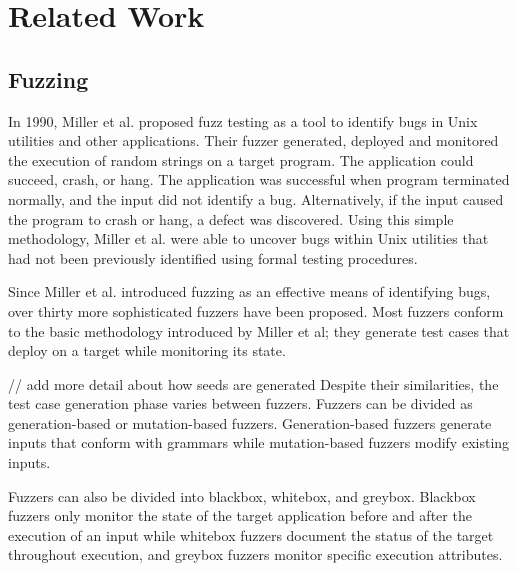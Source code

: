 \section{Related Work}

\subsection{Fuzzing}
In 1990, Miller et al. proposed fuzz testing as a tool to identify bugs in Unix utilities and other 
applications. Their fuzzer generated, deployed and monitored the execution of random strings on a 
target program. The application could succeed, crash, or hang. The application was successful when 
program terminated normally, and the input did not identify a bug. Alternatively, if the input caused 
the program to crash or hang, a defect was discovered. Using this simple methodology, Miller et al. 
were able to uncover bugs within Unix utilities that had not been previously identified using formal 
testing procedures. \cite{Miller}

Since Miller et al. introduced fuzzing as an effective means of identifying bugs, over thirty more 
sophisticated fuzzers have been proposed. Most fuzzers conform to the basic methodology introduced by 
Miller et al; they generate test cases that deploy on a target while monitoring its state. 

// add more detail about how seeds are generated
Despite their similarities, the test case generation phase varies between fuzzers. Fuzzers can be 
divided as generation-based or mutation-based fuzzers. Generation-based fuzzers generate inputs that 
conform with grammars while mutation-based fuzzers modify existing inputs. 

Fuzzers can also be divided into blackbox, whitebox, and greybox. Blackbox fuzzers only monitor the 
state of the target application before and after the execution of an input while whitebox fuzzers 
document the status of the target throughout execution, and greybox fuzzers monitor specific 
execution attributes. \cite{Zhu}

